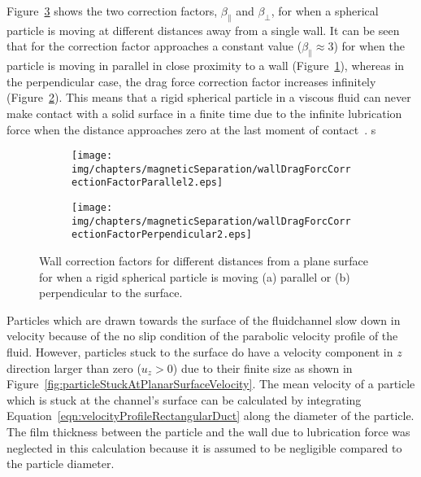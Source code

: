 Figure~\ref{fig:wallCorrectionFactors} shows the two correction factors, $\beta_{\parallel}$ and $\beta_{\perp}$, for when a spherical particle is moving at different distances away from a single wall. It can be seen that for the correction factor approaches a constant value ($\beta_{\parallel}\approx 3$) for when the particle is moving in parallel in close proximity to a wall (Figure~\ref{fig:wallCorrectionFactorsParallel}), whereas in the perpendicular case, the drag force correction factor increases infinitely (Figure~\ref{fig:wallCorrectionFactorsPerpendicular}). This means that a rigid spherical particle in a viscous fluid can never make contact with a solid surface in a finite time due to the infinite lubrication force when the distance approaches zero at the last moment of contact~\cite{Brenner1961,Cox1967,Davis1986}.%
s
\begin{figure}[ht]
        \centering
        \begin{subfigure}[b]{0.48\textwidth}
				\texttt{[image: img/chapters/magneticSeparation/wallDragForcCorrectionFactorParallel2.eps]}
				\caption{}
				\label{fig:wallCorrectionFactorsParallel}
        \end{subfigure}                        
        \begin{subfigure}[b]{0.48\textwidth}
				\texttt{[image: img/chapters/magneticSeparation/wallDragForcCorrectionFactorPerpendicular2.eps]}
                \caption{}
 				\label{fig:wallCorrectionFactorsPerpendicular}
        \end{subfigure}         
        \caption[Wall correction factor for spheric particles in proximity to a planar wall]{Wall correction factors for different distances from a plane surface for when a rigid spherical particle is moving (a) parallel or (b) perpendicular to the surface.}
        \label{fig:wallCorrectionFactors}
\end{figure}

Particles which are drawn towards the surface of the fluidchannel slow down in velocity because of the no slip condition of the parabolic velocity profile of the fluid. However, particles stuck to the surface do have a velocity component in $z$ direction larger than zero ($u_{z} > 0$) due to their finite size as shown in Figure~\ref{fig:particleStuckAtPlanarSurfaceVelocity}. The mean velocity of a particle which is stuck at the channel's surface can be calculated by integrating Equation~\ref{eqn:velocityProfileRectangularDuct} along the diameter of the particle. The film thickness between the particle and the wall due to lubrication force was neglected in this calculation because it is assumed to be negligible compared to the particle diameter. 

